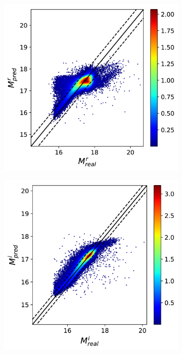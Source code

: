 \documentclass[12pt,letterpaper,oneside,openright]{book}
\begin{document}
\begin{figure}[]
\begin{subfigure}[b]{0.3\textwidth}
    \label{fig:2}
  \end{subfigure}
  \hspace{0cm}
  \begin{subfigure}[b]{0.3\textwidth}
    \includegraphics[width=\textwidth, height = \textwidth]{Figures/pmr3.png}
    \label{fig:2}
    \hspace{0cm}
  \end{subfigure}
  \centering
   \begin{subfigure}[b]{0.3\textwidth}
    \includegraphics[width=\textwidth, height = \textwidth]{Figures/pmi3.png}

\end{subfigure}
\end{figure}
\end{document}
